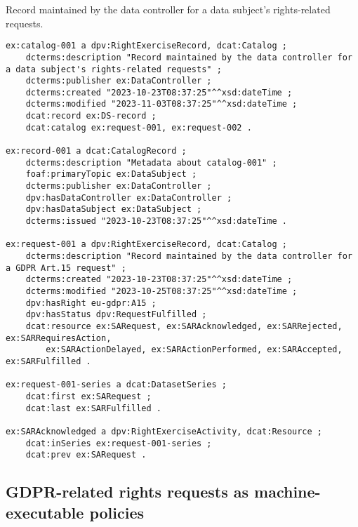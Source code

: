 \documentclass{IOS-Book-Article}     %
\begin{document}
\begin{listing}
\caption{Record maintained by the data controller for a data subject's rights-related requests.}
\label{lst:record}
\begin{verbatim}
ex:catalog-001 a dpv:RightExerciseRecord, dcat:Catalog ;
    dcterms:description "Record maintained by the data controller for a data subject's rights-related requests" ;
    dcterms:publisher ex:DataController ;
    dcterms:created "2023-10-23T08:37:25"^^xsd:dateTime ;
    dcterms:modified "2023-11-03T08:37:25"^^xsd:dateTime ;
    dcat:record ex:DS-record ;
    dcat:catalog ex:request-001, ex:request-002 .

ex:record-001 a dcat:CatalogRecord ;
    dcterms:description "Metadata about catalog-001" ;
    foaf:primaryTopic ex:DataSubject ;
    dcterms:publisher ex:DataController ;
    dpv:hasDataController ex:DataController ;
    dpv:hasDataSubject ex:DataSubject ;
    dcterms:issued "2023-10-23T08:37:25"^^xsd:dateTime .

ex:request-001 a dpv:RightExerciseRecord, dcat:Catalog ;
    dcterms:description "Record maintained by the data controller for a GDPR Art.15 request" ;
    dcterms:created "2023-10-23T08:37:25"^^xsd:dateTime ;
    dcterms:modified "2023-10-25T08:37:25"^^xsd:dateTime ;
    dpv:hasRight eu-gdpr:A15 ;
    dpv:hasStatus dpv:RequestFulfilled ;
    dcat:resource ex:SARequest, ex:SARAcknowledged, ex:SARRejected, ex:SARRequiresAction, 
        ex:SARActionDelayed, ex:SARActionPerformed, ex:SARAccepted, ex:SARFulfilled .

ex:request-001-series a dcat:DatasetSeries ;
    dcat:first ex:SARequest ;
    dcat:last ex:SARFulfilled .

ex:SARAcknowledged a dpv:RightExerciseActivity, dcat:Resource ;
    dcat:inSeries ex:request-001-series ;
    dcat:prev ex:SARequest .
\end{verbatim}
\end{listing}

\subsection{GDPR-related rights requests as machine-executable policies}
\label{sec:policies}
\end{document}
